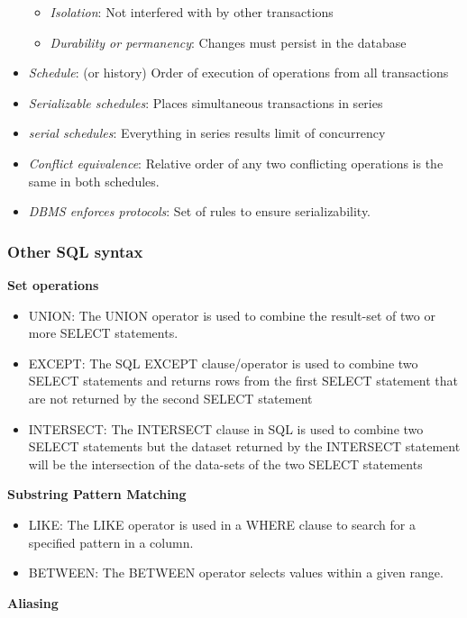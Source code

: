 \begin{itemize}
\begin{itemize}
        \item \textit{Isolation}: Not interfered with by other transactions
        \item \textit{Durability or permanency}: Changes must persist in the database
    \end{itemize}
    \item \textit{Schedule}: (or history) Order of execution of operations from all transactions
    \item \textit{Serializable schedules}: Places simultaneous transactions in series
    \item \textit{serial schedules}: Everything in series results limit of concurrency
    \item \textit{Conflict equivalence}: Relative order of any two conflicting operations is the same in both schedules.
    \item \textit{DBMS enforces protocols}: Set of rules to ensure serializability.
\end{itemize}

\subsubsection{Other SQL syntax}
\textbf{Set operations}
\begin{itemize}
    \item UNION: The UNION operator is used to combine the result-set of two or more SELECT statements.
    \item EXCEPT: The SQL EXCEPT clause/operator is used to combine two SELECT statements and returns rows from the first SELECT statement that are not returned by the second SELECT statement
    \item INTERSECT: The INTERSECT clause in SQL is used to combine two SELECT statements but the dataset returned by the INTERSECT statement will be the intersection of the data-sets of the two SELECT statements
\end{itemize}

\textbf{Substring Pattern Matching}
\begin{itemize}
    \item LIKE: The LIKE operator is used in a WHERE clause to search for a specified pattern in a column.
    \item BETWEEN: The BETWEEN operator selects values within a given range.
\end{itemize}

\textbf{Aliasing}


